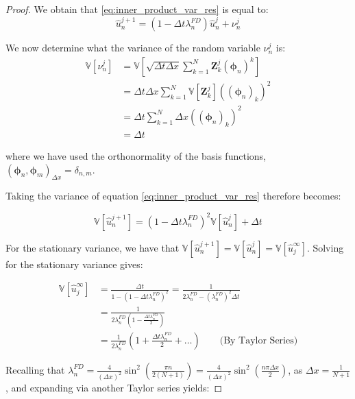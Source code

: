 \begin{proof}
We obtain that \eqref{eq:inner_product_var_res} is equal to:
\begin{equation}
    \hat{u}_n^{j+1} = (1 - \Delta t \lambda_n^{FD}) \hat{u}_n^j + 
    \nu_n^j
\end{equation}

We now determine what the variance of the random variable 
$\nu_n^j$ is:
\begin{align*}
    \mathbb{V}[\nu_n^j] &= \mathbb{V}\left[\sqrt{\Delta t \Delta x}
    \sum_{k=1}^N\mathbf{Z}_k^j(\boldsymbol{\phi}_n)^k\right] \\
    &=\Delta t \Delta x \sum_{k=1}^N \mathbb{V}[\mathbf{Z}_k^j]
    ((\boldsymbol{\phi}_n)_k)^2 \\
    &= \Delta t \sum_{k=1}^N \Delta x  ((\boldsymbol{\phi}_n)_k)^2\\
    &= \Delta t
\end{align*}

where we have used the orthonormality of the basis functions, 
$(\boldsymbol{\phi}_n, \boldsymbol{\phi}_m)_{\Delta x} = 
\delta_{n,m}$.

Taking the variance of equation 
\eqref{eq:inner_product_var_res} therefore becomes:

\begin{equation}\label{eq:var_of_relation}
    \mathbb{V}[\hat{u}_n^{j+1}] = (1-\Delta t \lambda_n^{FD})^2
    \mathbb{V}[\hat{u}_n^j] + \Delta t
\end{equation}

For the stationary variance, we have that 
$\mathbb{V}[\hat{u}_n^{j+1}] = 
\mathbb{V}[\hat{u}_n^{j}] = 
\mathbb{V}[\hat{u}_j^\infty]$. Solving for the stationary 
variance gives:

\begin{align}
\mathbb{V}[\hat{u}_j^\infty] 
&= \frac{\Delta t}{1 - 
(1-\Delta t \lambda_n^{FD})^2} = 
\frac{1}{2\lambda_n^{FD} - 
(\lambda_n^{FD})^2 \Delta t}
\label{eq:fourier_variance_stationary}
\\
&= \frac{1}{2\lambda_n^{FD}(1 - \frac{\Delta t \lambda_n^{FD}}{2})}\\
&= \frac{1}{2\lambda_n^{FD}}(1 + \frac{\Delta t \lambda_n^{FD}}{2}
+ \dots)\label{eq:using_taylor_series} \qquad 
\text{(By Taylor Series)}
\end{align}

Recalling that $\lambda_n^{FD} = \frac{4}{(\Delta x)^2}
\sin^2\left(\frac{\pi n}{2(N+1)}\right) = \frac{4}{(\Delta x)^2}
\sin^2\left(\frac{n \pi \Delta x}{2}\right)$, as $\Delta x = \frac{1}
{N+1}$, and expanding via another Taylor series yields:


\end{proof}
